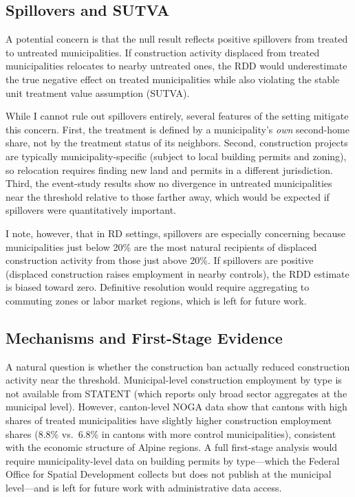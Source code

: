 \documentclass[12pt]{article}
\begin{document}
\subsection{Spillovers and SUTVA}

A potential concern is that the null result reflects positive spillovers from treated to untreated municipalities. If construction activity displaced from treated municipalities relocates to nearby untreated ones, the RDD would underestimate the true negative effect on treated municipalities while also violating the stable unit treatment value assumption (SUTVA).

While I cannot rule out spillovers entirely, several features of the setting mitigate this concern. First, the treatment is defined by a municipality's \textit{own} second-home share, not by the treatment status of its neighbors. Second, construction projects are typically municipality-specific (subject to local building permits and zoning), so relocation requires finding new land and permits in a different jurisdiction. Third, the event-study results show no divergence in untreated municipalities near the threshold relative to those farther away, which would be expected if spillovers were quantitatively important.

I note, however, that in RD settings, spillovers are especially concerning because municipalities just below 20\% are the most natural recipients of displaced construction activity from those just above 20\%. If spillovers are positive (displaced construction raises employment in nearby controls), the RDD estimate is biased toward zero. Definitive resolution would require aggregating to commuting zones or labor market regions, which is left for future work.

\subsection{Mechanisms and First-Stage Evidence}

A natural question is whether the construction ban actually reduced construction activity near the threshold. Municipal-level construction employment by type is not available from STATENT (which reports only broad sector aggregates at the municipal level). However, canton-level NOGA data show that cantons with high shares of treated municipalities have slightly higher construction employment shares (8.8\% vs.\ 6.8\% in cantons with more control municipalities), consistent with the economic structure of Alpine regions. A full first-stage analysis would require municipality-level data on building permits by type---which the Federal Office for Spatial Development collects but does not publish at the municipal level---and is left for future work with administrative data access.
\end{document}
